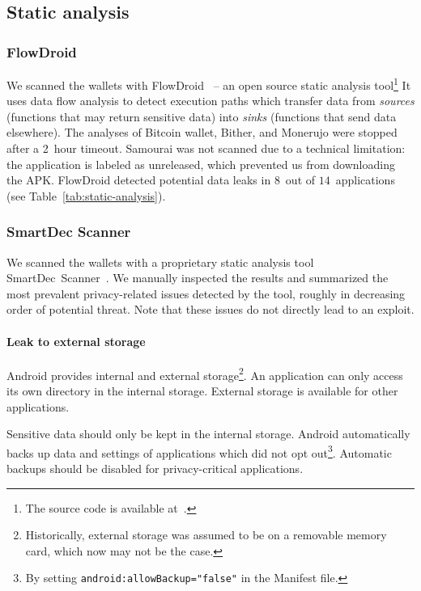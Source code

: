 \subsection{Static analysis}

\subsubsection*{FlowDroid}

We scanned the wallets with FlowDroid~\cite{Arzt2014} -- an open source static analysis tool\footnote{The source code is available at~\cite{FlowDroid}.}
It uses data flow analysis to detect execution paths which transfer data from \textit{sources} (functions that may return sensitive data) into \textit{sinks} (functions that send data elsewhere).
The analyses of Bitcoin wallet, Bither, and Monerujo were stopped after a 2~hour timeout.
Samourai was not scanned due to a technical limitation: the application is labeled as unreleased, which prevented us from downloading the APK\@.
FlowDroid detected potential data leaks in $8$~out of $14$~applications (see Table~\ref{tab:static-analysis}).

\subsubsection*{SmartDec Scanner}
We scanned the wallets with a proprietary static analysis tool SmartDec~Scanner~\cite{SmartDec2018}.
We manually inspected the results and summarized the most prevalent privacy-related issues detected by the tool, roughly in decreasing order of potential threat.
Note that these issues do not directly lead to an exploit.

\paragraph{Leak to external storage}
Android provides internal and external storage\footnote{Historically, external storage was assumed to be on a removable memory card, which now may not be the case.}.
An application can only access its own directory in the internal storage.
External storage is available for other applications.

Sensitive data should only be kept in the internal storage.
Android automatically backs up data and settings of applications which did not opt out\footnote{By setting \texttt{android:allowBackup="false"} in the Manifest file.}.
Automatic backups should be disabled for privacy-critical applications.

